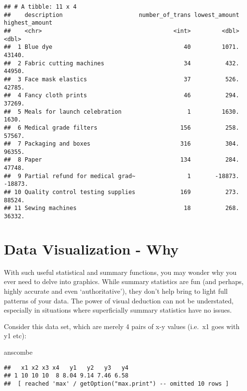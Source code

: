 \documentclass[
]{book}
\newenvironment{Shaded}{\begin{snugshade}}{\end{snugshade}}
\newcommand{\NormalTok}[1]{#1}
\begin{document}
\begin{verbatim}
## # A tibble: 11 x 4
##    description                      number_of_trans lowest_amount highest_amount
##    <chr>                                      <int>         <dbl>          <dbl>
##  1 Blue dye                                      40         1071.         43140.
##  2 Fabric cutting machines                       34          432.         44950.
##  3 Face mask elastics                            37          526.         42785.
##  4 Fancy cloth prints                            46          294.         37269.
##  5 Meals for launch celebration                   1         1630.          1630.
##  6 Medical grade filters                        156          258.         57567.
##  7 Packaging and boxes                          316          304.         96355.
##  8 Paper                                        134          284.         47748.
##  9 Partial refund for medical grad~               1       -18873.        -18873.
## 10 Quality control testing supplies             169          273.         88524.
## 11 Sewing machines                               18          268.         36332.
\end{verbatim}

\hypertarget{data-visualization---why}{%
\section{Data Visualization - Why}\label{data-visualization---why}}

With such useful statistical and summary functions, you may wonder why you ever need to delve into graphics. While summary statistics are fun (and perhaps, highly accurate and even `authoritative'), they don't help bring to light full patterns of your data. The power of visual deduction can not be understated, especially in situations where superficially summary statistics have no issues.

Consider this data set, which are merely 4 pairs of x-y values (i.e.~x1 goes with y1 etc):

\begin{Shaded}
\begin{Highlighting}[]
\NormalTok{anscombe}
\end{Highlighting}
\end{Shaded}

\begin{verbatim}
##   x1 x2 x3 x4   y1   y2   y3   y4
## 1 10 10 10  8 8.04 9.14 7.46 6.58
##  [ reached 'max' / getOption("max.print") -- omitted 10 rows ]
\end{verbatim}
\end{document}
